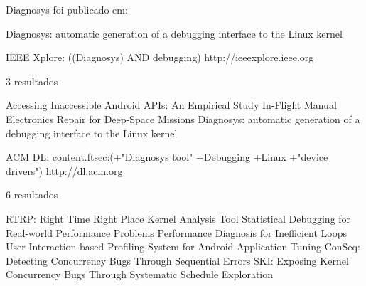 Diagnosys foi publicado em:

Diagnosys: automatic generation of a debugging interface to the Linux kernel

IEEE Xplore: ((Diagnosys) AND debugging) 
http://ieeexplore.ieee.org

3 resultados

Accessing Inaccessible Android APIs: An Empirical Study
In-Flight Manual Electronics Repair for Deep-Space Missions
Diagnosys: automatic generation of a debugging interface to the Linux kernel

ACM DL: content.ftsec:(+"Diagnosys tool" +Debugging +Linux +"device drivers")
http://dl.acm.org

6 resultados

RTRP: Right Time Right Place Kernel Analysis Tool
Statistical Debugging for Real-world Performance Problems
Performance Diagnosis for Inefficient Loops
User Interaction-based Profiling System for Android Application Tuning
ConSeq: Detecting Concurrency Bugs Through Sequential Errors
SKI: Exposing Kernel Concurrency Bugs Through Systematic Schedule Exploration
